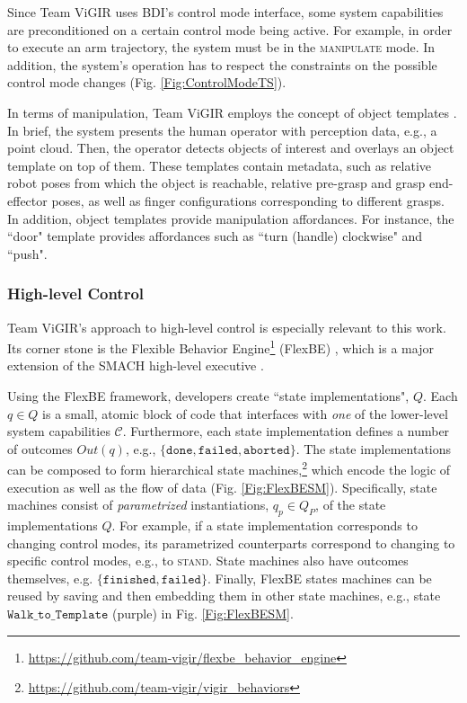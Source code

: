 Since Team ViGIR uses BDI's control mode interface, some system capabilities are preconditioned on a certain control mode being active.
For example, in order to execute an arm trajectory, the system must be in the \textsc{manipulate} mode.
In addition, the system's operation has to respect the constraints on the possible control mode changes (Fig. \ref{Fig:ControlModeTS}).

In terms of manipulation, Team ViGIR employs the concept of object templates \cite{Alberto2014Humanoids}.
In brief, the system presents the human operator with perception data, e.g., a point cloud.
Then, the operator detects objects of interest and overlays an object template on top of them.
These templates contain metadata, such as relative robot poses from which the object is reachable, relative pre-grasp and grasp end-effector poses, as well as finger configurations corresponding to different grasps.
In addition, object templates provide manipulation affordances.
For instance, the ``door" template provides affordances such as ``turn (handle) clockwise" and ``push".

\subsubsection*{High-level Control}\label{S:FlexBE}
Team ViGIR's approach to high-level control is especially relevant to this work.
Its corner stone is the Flexible Behavior Engine\footnote{\scriptsize{\url{https://github.com/team-vigir/flexbe_behavior_engine}}} (FlexBE) \cite{Philipp2013Bsc, Philipp2015Msc}, which is a major extension of the SMACH high-level executive \cite{SMACH2010RAM}.

Using the FlexBE framework, developers create ``state implementations", $Q$. %
Each $q \in Q$ is a small, atomic block of code that interfaces with \emph{one} of the lower-level system capabilities $\mathcal{C}$.
Furthermore, each state implementation defines a number of outcomes $Out(q)$, e.g., $\{ \mathtt{done}, \mathtt{failed}, \mathtt{aborted} \}$.
The state implementations can be composed to form hierarchical state machines,\footnote{\scriptsize{\url{https://github.com/team-vigir/vigir_behaviors}}}
 which encode the logic of execution as well as the flow of data (Fig. \ref{Fig:FlexBESM}).
Specifically, state machines consist of \emph{parametrized} instantiations, $q_p \in Q_P$, of the state implementations $Q$.
For example, if a state implementation corresponds to changing control modes, its parametrized counterparts correspond to changing to specific control modes, e.g., to \textsc{stand}.
State machines also have outcomes themselves, e.g. $\{ \mathtt{finished}, \mathtt{failed} \}$.
Finally, FlexBE states machines can be reused by saving and then embedding them in other state machines, e.g., state $\mathtt{Walk\_to\_Template}$ (purple) in Fig. \ref{Fig:FlexBESM}.

